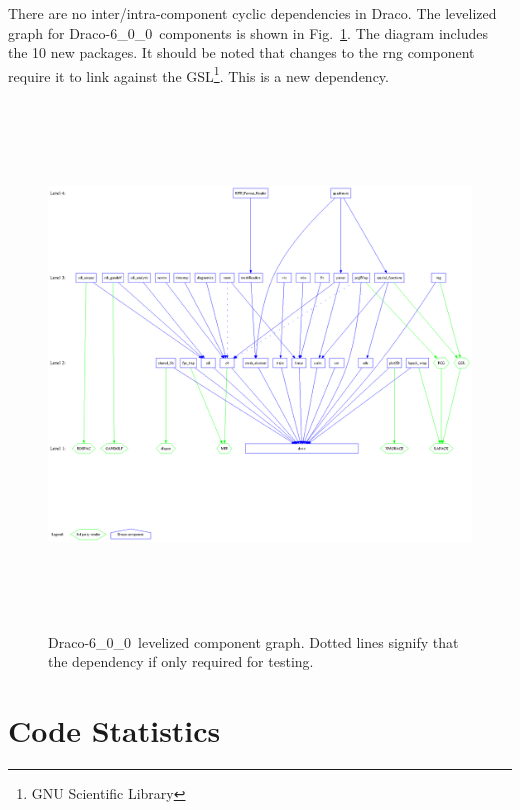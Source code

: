 \documentclass[note]{ResearchNote}
\newcommand{\draco}{Draco}
\newcommand{\dracor}{\draco-6\_0\_0}
\begin{document}
There are no inter/intra-component cyclic dependencies in \draco.  The
levelized graph for \dracor\ components is shown in
Fig.~\ref{fig:level}.  The diagram includes the 10 new packages.  It
should be noted that changes to the \textsf{rng} component require it
to link against the \textsf{GSL}\footnote{GNU Scientific Library}.
This is a new dependency.
\begin{figure}
  \label{fig:level}
  \centerline{
    \includegraphics[height=5.5in]{level-6_0_0.ps}}
  \caption{\dracor\ levelized component graph.  Dotted lines signify
    that the dependency if only required for testing.}
\end{figure}


\section{Code Statistics}




\end{document}
